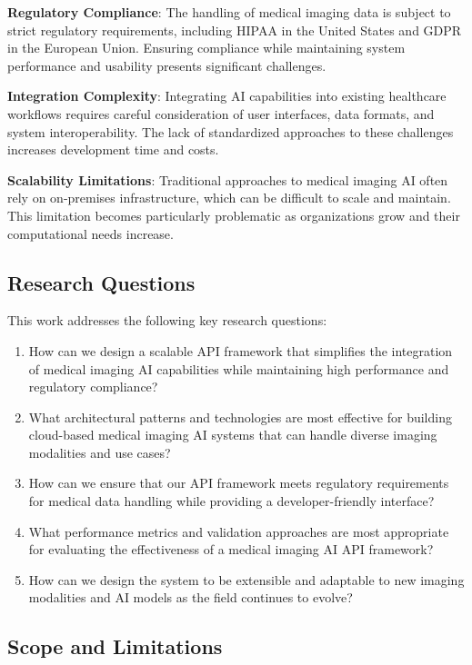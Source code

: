 \documentclass[12pt,a4paper]{article}
\begin{document}
\textbf{Regulatory Compliance}: The handling of medical imaging data is subject to strict regulatory requirements, including HIPAA in the United States and GDPR in the European Union. Ensuring compliance while maintaining system performance and usability presents significant challenges.

\textbf{Integration Complexity}: Integrating AI capabilities into existing healthcare workflows requires careful consideration of user interfaces, data formats, and system interoperability. The lack of standardized approaches to these challenges increases development time and costs.

\textbf{Scalability Limitations}: Traditional approaches to medical imaging AI often rely on on-premises infrastructure, which can be difficult to scale and maintain. This limitation becomes particularly problematic as organizations grow and their computational needs increase.

\subsection{Research Questions}

This work addresses the following key research questions:

\begin{enumerate}
    \item How can we design a scalable API framework that simplifies the integration of medical imaging AI capabilities while maintaining high performance and regulatory compliance?
    \item What architectural patterns and technologies are most effective for building cloud-based medical imaging AI systems that can handle diverse imaging modalities and use cases?
    \item How can we ensure that our API framework meets regulatory requirements for medical data handling while providing a developer-friendly interface?
    \item What performance metrics and validation approaches are most appropriate for evaluating the effectiveness of a medical imaging AI API framework?
    \item How can we design the system to be extensible and adaptable to new imaging modalities and AI models as the field continues to evolve?
\end{enumerate}

\subsection{Scope and Limitations}
\end{document}
